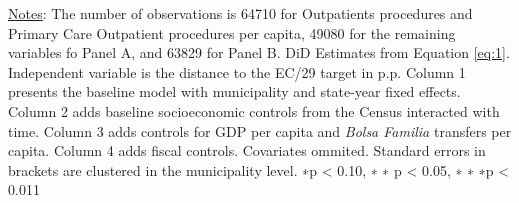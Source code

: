\begin{table}[h!]
\begin{footnotesize}
\begin{center}
{\begin{threeparttable}[b]
    \begin{tablenotes}
  \scriptsize{\underline{Notes}: The number of observations is 64710 for Outpatients procedures and Primary Care Outpatient procedures per capita, 49080 for the remaining variables fo Panel A, and  63829 for Panel B. DiD Estimates from Equation \ref{eq:1}. Independent variable is the distance to the EC/29 target in p.p. Column 1 presents the baseline model with municipality and state-year fixed effects. Column 2 adds baseline socioeconomic controls from the Census interacted with time. Column 3 adds controls for GDP per capita and \emph{Bolsa Familia} transfers per capita. Column 4 adds fiscal controls. Covariates ommited. Standard errors in brackets are clustered in the municipality level. ∗p < 0.10, ∗ ∗ p < 0.05, ∗ ∗ ∗p < 0.011}
  \end{tablenotes}
    
    
  \label{table:production}%

\end{threeparttable}
}
\end{center}
\end{footnotesize}
\end{table}